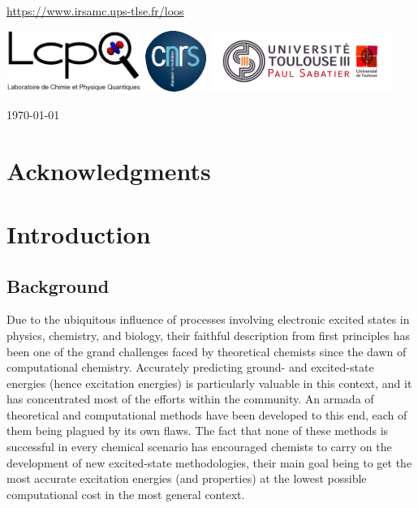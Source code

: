 \documentclass[11pt,a4paper]{article}
\begin{document}
\begin{center}
{\url{https://www.irsamc.ups-tlse.fr/loos}
} %

\vspace{0.5cm}
\includegraphics[height=2cm]{LCPQ_logo.pdf} \hfill \includegraphics[height=2cm]{LogoCNRS.eps} \hfill \includegraphics[height=2cm]{UPS_logo.jpg}

\end{center}

\vfill
\hfill \today

\newpage
\thispagestyle{empty}

\setlength{\parindent}{17pt}

\section*{Acknowledgments}

\tableofcontents

\newpage
\setcounter{page}{1}

\section{Introduction}
\label{sec:intro}

\subsection{Background}

Due to the ubiquitous influence of processes involving electronic excited states in physics, chemistry, and biology, their faithful description from first principles has been one of the grand challenges faced by theoretical chemists since the dawn of computational chemistry. 
Accurately predicting ground- and excited-state energies (hence excitation energies) is particularly valuable in this context, and it has concentrated most of the efforts within the community.
An armada of theoretical and computational methods have been developed to this end, each of them being plagued by its own flaws. 
The fact that none of these methods is successful in every chemical scenario has encouraged chemists to carry on the development of new excited-state methodologies, their main goal being to get the most accurate excitation energies (and properties) at the lowest possible computational cost in the most general context.
\end{document}
